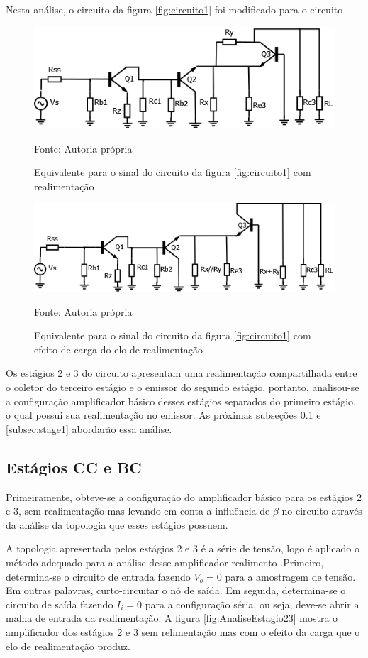 \documentclass[openright]{normas-utf-tex} %
\begin{document}
Nesta análise, o circuito da figura \ref{fig:circuito1} foi modificado para o circuito 


\begin{figure}[H]
\centering
\includegraphics[width=0.75\linewidth]{img/CircuitoComRealimentaoSinal.png}
\caption{Equivalente para o sinal do circuito da figura \ref{fig:circuito1} com realimentação}
Fonte: Autoria própria
\label{fig:circuito_sinal_com_real}
\end{figure}


\begin{figure}[H]
\centering
\includegraphics[width=0.75\linewidth]{img/CircuitoSemRealimentaoSinal.png}
\caption{Equivalente para o sinal do circuito da figura \ref{fig:circuito1} com efeito de carga do elo de realimentação}
Fonte: Autoria própria
\label{fig:circuito_sinal_sem_real}
\end{figure}


Os estágios 2 e 3 do circuito apresentam uma realimentação compartilhada entre o coletor do terceiro estágio e o emissor do segundo estágio, portanto, analisou-se a configuração amplificador básico desses estágios separados do primeiro estágio, o qual possui sua realimentação no emissor.
	As próximas subseções \ref{subsec:stage_2_3} e \ref{subsec:stage1} abordarão essa análise.

\subsection{Estágios CC e BC}
\label{subsec:stage_2_3}

Primeiramente, obteve-se a configuração do amplificador básico para os estágios 2 e 3, sem realimentação mas levando em conta a influência de $\beta$ no circuito através da análise da topologia que esses estágios possuem.

A topologia apresentada pelos estágios 2 e 3 é a série de tensão, logo é aplicado o método adequado para a análise desse amplificador realimento \cite{millman}.Primeiro, determina-se o circuito de entrada fazendo $V_o = 0$ para a amostragem de tensão. Em outras palavras, curto-circuitar o nó de saída. Em seguida, determina-se o circuito de saída fazendo $I_i = 0$ para a configuração séria, ou seja, deve-se abrir a malha de entrada da realimentação. A figura \ref{fig:AnaliseEstagio23}
mostra o amplificador dos estágios 2 e 3 sem relimentação mas com o efeito da carga que o elo de realimentação produz.
\end{document}
